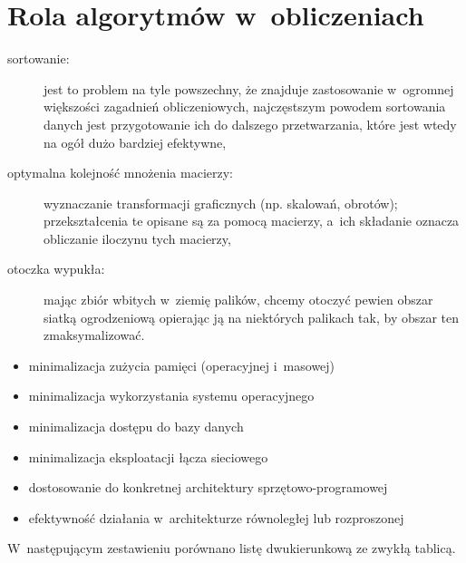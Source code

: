 \chapter{Rola algorytmów w~obliczeniach}


\exercise{} %
\begin{description}
	\item[sortowanie:] jest to problem na tyle powszechny, że znajduje zastosowanie w~ogromnej większości zagadnień obliczeniowych, najczęstszym powodem sortowania danych jest przygotowanie ich do dalszego przetwarzania, które jest wtedy na ogół dużo bardziej efektywne,
	\item[optymalna kolejność mnożenia macierzy:] wyznaczanie transformacji graficznych (np. skalowań, obrotów); przekształcenia te opisane są za pomocą macierzy, a~ich składanie oznacza obliczanie iloczynu tych macierzy,
	\item[otoczka wypukła:] mając zbiór wbitych w~ziemię palików, chcemy otoczyć pewien obszar siatką ogrodzeniową opierając ją na niektórych palikach tak, by obszar ten zmaksymalizować.
\end{description}

\exercise{} %
\begin{itemize}
	\item minimalizacja zużycia pamięci (operacyjnej i~masowej)
	\item minimalizacja wykorzystania systemu operacyjnego
	\item minimalizacja dostępu do bazy danych
	\item minimalizacja eksploatacji łącza sieciowego
	\item dostosowanie do konkretnej architektury sprzętowo-programowej
	\item efektywność działania w~architekturze równoległej lub rozproszonej
\end{itemize}

\exercise{} %
W~następującym zestawieniu porównano listę dwukierunkową ze zwykłą tablicą.

